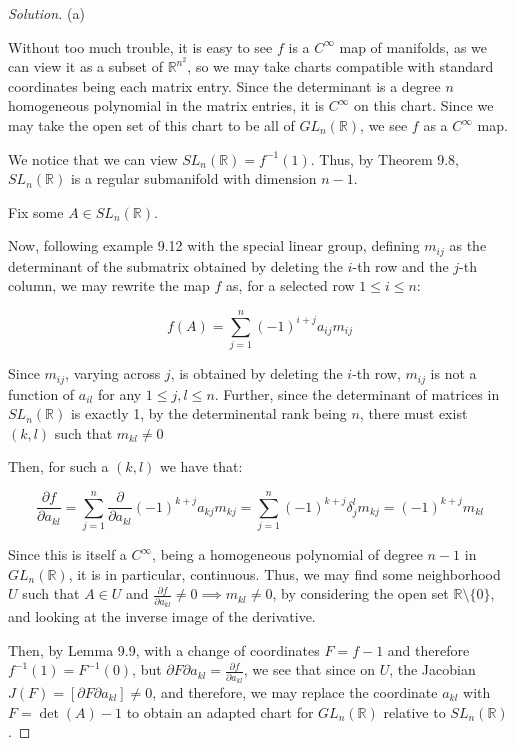 \documentclass[10pt]{article}
\theoremstyle{nonumberplain}%
\begin{document}
\begin{proof}[Solution]

(a)

Without too much trouble, it is easy to see $f$ is a $C^\infty$ map of manifolds, as we can view it as a subset of $\mathbb{R}^{n^2}$, so we may take charts compatible with standard coordinates being each matrix entry. Since the determinant is a degree $n$ homogeneous polynomial in the matrix entries, it is $C^\infty$ on this chart. Since we may take the open set of this chart to be all of $GL_n(\mathbb{R})$, we see $f$ as a $C^\infty$ map.

We notice that we can view $SL_n(\mathbb{R}) = f^{-1}(1)$. Thus, by Theorem 9.8, $SL_n(\mathbb{R})$ is a regular submanifold with dimension $n-1$.

Fix some $A \in SL_n(\mathbb{R})$.

Now, following example 9.12 with the special linear group, defining $m_{ij}$ as the determinant of the submatrix obtained by deleting the $i$-th row and the $j$-th column, we may rewrite the map $f$ as, for a selected row $1 \leq i \leq n$:

$$f(A) = \sum_{j=1}^n (-1)^{i+j} a_{ij}m_{ij} $$

Since $m_{ij}$, varying across $j$, is obtained by deleting the $i$-th row, $m_{ij}$ is not a function of $a_{il}$ for any $1 \leq j, l \leq n$. Further, since the determinant of matrices in $SL_n(\mathbb{R})$ is exactly 1, by the determinental rank being $n$, there must exist $(k,l)$ such that $m_{kl} \not = 0$

Then, for such a $(k,l)$ we have that:

$$ \frac{\partial f}{\partial a_{kl}} =  \sum_{j=1}^n  \frac{\partial}{\partial a_{kl}} (-1)^{k+j} a_{kj}m_{kj} = \sum_{j=1}^n   (-1)^{k+j} \delta_j^l m_{kj} =  (-1)^{k+j} m_{kl}$$

Since this is itself a $C^\infty$, being a homogeneous polynomial of degree $n-1$ in $GL_n(\mathbb{R})$, it is in particular, continuous. Thus, we may find some neighborhood $U$ such that $A \in U$ and $ \frac{\partial f}{\partial a_{kl}} \not = 0 \implies m_{kl} \not = 0 $, by considering the open set $\mathbb{R} \setminus \{ 0 \}$, and looking at the inverse image of the derivative.

Then, by Lemma 9.9, with a change of coordinates $F = f - 1$ and therefore $f^{-1}(1) = F^{-1}(0)$, but $\partial{F}{\partial a_{kl}} =  \frac{\partial f}{\partial a_{kl}}$, we see that since on $U$, the Jacobian $J(F) = \left[ \partial{F}{\partial a_{kl}} \right] \not = 0$, and therefore, we may replace the coordinate $a_{kl}$ with $F = \det(A) - 1$ to obtain an adapted chart for $GL_n(\mathbb{R})$ relative to $SL_n(\mathbb{R})$.


\end{proof}
\end{document}
